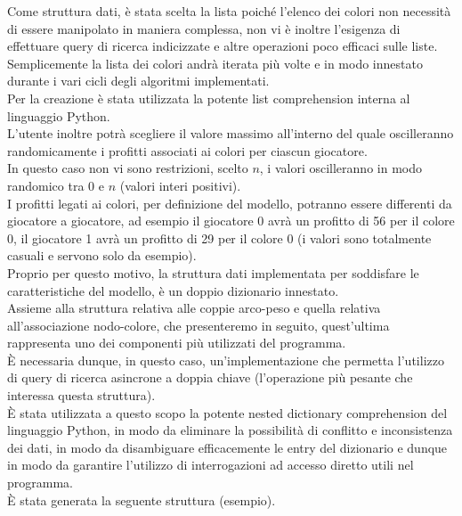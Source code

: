 Come struttura dati, è stata scelta la lista poiché l'elenco dei colori non necessità di essere manipolato in maniera complessa, non vi è inoltre l'esigenza di effettuare query di ricerca indicizzate e altre operazioni poco efficaci sulle liste.\\
Semplicemente la lista dei colori andrà iterata più volte e in modo innestato durante i vari cicli degli algoritmi implementati.\\
Per la creazione è stata utilizzata la potente list comprehension interna al linguaggio Python.\\

L'utente inoltre potrà scegliere il valore massimo all'interno del quale oscilleranno randomicamente i profitti associati ai colori per ciascun giocatore.\\
In questo caso non vi sono restrizioni, scelto \(n\), i valori oscilleranno in modo randomico tra 0 e \(n\) (valori interi positivi).\\
I profitti legati ai colori, per definizione del modello, potranno essere differenti da giocatore a giocatore, ad esempio il giocatore 0 avrà un profitto di 56 per il colore 0, il giocatore 1 avrà un profitto di 29 per il colore 0 (i valori sono totalmente casuali e servono solo da esempio).\\

Proprio per questo motivo, la struttura dati implementata per soddisfare le caratteristiche del modello, è un doppio dizionario innestato.\\
Assieme alla struttura relativa alle coppie arco-peso e quella relativa all'associazione nodo-colore, che presenteremo in seguito, quest'ultima rappresenta uno dei componenti più utilizzati del programma.\\
È necessaria dunque, in questo caso, un'implementazione che permetta l'utilizzo di query di ricerca asincrone a doppia chiave (l'operazione più pesante che interessa questa struttura).\\
È stata utilizzata a questo scopo la potente nested dictionary comprehension del linguaggio Python, in modo da eliminare la possibilità di conflitto e inconsistenza dei dati, in modo da disambiguare efficacemente le entry del dizionario e dunque in modo da garantire l'utilizzo di interrogazioni ad accesso diretto utili nel programma.\\
È stata generata la seguente struttura (esempio).

